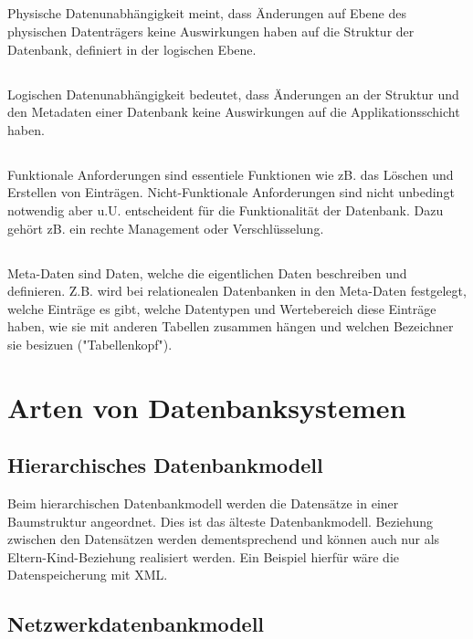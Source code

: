 \subsection{}
Physische Datenunabhängigkeit meint, dass Änderungen auf Ebene des physischen Datenträgers keine Auswirkungen haben auf die Struktur der Datenbank, definiert in der logischen Ebene.

\subsection{}
Logischen Datenunabhängigkeit bedeutet, dass Änderungen an der Struktur und den Metadaten einer Datenbank keine Auswirkungen auf die Applikationsschicht haben.

\subsection{}
Funktionale Anforderungen sind essentiele Funktionen wie zB. das Löschen und Erstellen von Einträgen. Nicht-Funktionale Anforderungen sind nicht unbedingt notwendig aber u.U. entscheident für die Funktionalität der Datenbank. Dazu gehört zB. ein rechte Management oder Verschlüsselung. 

\subsection{}
Meta-Daten sind Daten, welche die eigentlichen Daten beschreiben und definieren. Z.B. wird bei relationealen Datenbanken in den Meta-Daten festgelegt, welche Einträge es gibt, welche Datentypen und Wertebereich diese Einträge haben, wie sie mit anderen Tabellen zusammen hängen und welchen Bezeichner sie besizuen ("Tabellenkopf").

\section{Arten von Datenbanksystemen}
\subsection{Hierarchisches Datenbankmodell}
Beim hierarchischen Datenbankmodell werden die Datensätze in einer Baumstruktur angeordnet. Dies ist das älteste Datenbankmodell. Beziehung zwischen den Datensätzen werden dementsprechend und können auch nur als Eltern-Kind-Beziehung realisiert werden. Ein Beispiel hierfür wäre die Datenspeicherung mit XML.

\subsection{Netzwerkdatenbankmodell}
